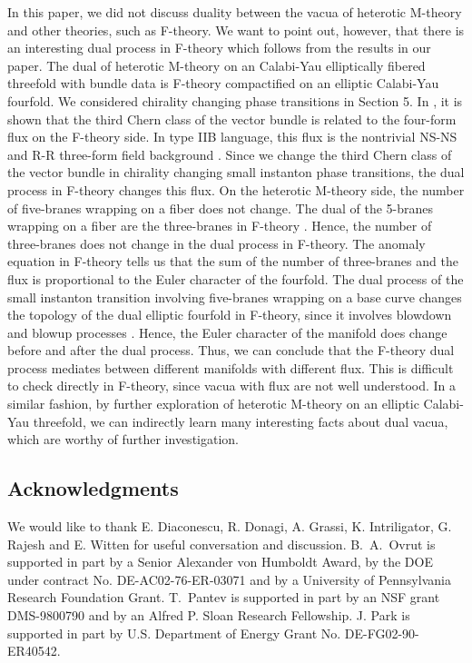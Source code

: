 \documentclass[a4paper,12pt]{article}
\numberwithin{equation}{section}
\theoremstyle{plain}
\begin{document}
In this paper, we did not discuss duality between the vacua of heterotic
M-theory and other theories, such as F-theory. We want to point out, however,
that there is an interesting dual 
process in F-theory which follows from the results in our paper. The dual of 
heterotic M-theory on an Calabi-Yau 
elliptically fibered threefold with bundle data is F-theory
compactified on an elliptic Calabi-Yau fourfold.  
We considered chirality changing phase transitions in Section 5. 
In \cite{AnCu}, it is shown that the third Chern class of the vector bundle 
is related to the four-form flux on the F-theory side. 
In type IIB language, 
this flux is the nontrivial NS-NS and R-R three-form field 
background \cite{GVW, DRS}. Since we change the third Chern class of the vector
bundle in chirality changing small instanton phase transitions, 
the dual process in F-theory changes this flux. On the 
heterotic M-theory side, the 
number of five-branes wrapping on a fiber does not change. The dual of the 
5-branes wrapping on a fiber are the three-branes in F-theory \cite{SVW}. 
Hence, the number of three-branes does not change 
in the dual process in F-theory. The anomaly equation in F-theory tells us 
that the sum of the number of three-branes and the flux is proportional to 
the Euler character of the fourfold. The dual process of the small instanton 
transition involving five-branes wrapping on a base curve changes the topology 
of the dual elliptic fourfold in F-theory, since it involves blowdown and 
blowup processes \cite{MoVa, DiRa, Wi3}. Hence, the Euler character of the manifold 
does change before and after the dual process. Thus, we can conclude that 
the F-theory dual process mediates between 
different manifolds with different flux. 
This is difficult to check directly in F-theory, since vacua with 
flux are not well understood. In a similar fashion, 
by further exploration of heterotic M-theory on an elliptic 
Calabi-Yau threefold, 
we can indirectly learn many interesting facts about dual vacua, which are 
worthy of further investigation.  
 
 



\subsection*{Acknowledgments}

We would like to thank E. Diaconescu, R. Donagi, A. Grassi, K. Intriligator, 
G. Rajesh and E. Witten for useful conversation and discussion. 
B.~A.~Ovrut is supported in part by a Senior Alexander von Humboldt
Award, by the DOE under contract No. DE-AC02-76-ER-03071 and by a
University of Pennsylvania Research Foundation Grant.
T.~Pantev is supported in part by an NSF grant DMS-9800790 and by an
Alfred P. Sloan Research Fellowship.
J. Park is supported in part by U.S. Department of Energy Grant
No. DE-FG02-90-ER40542. 
\end{document}
